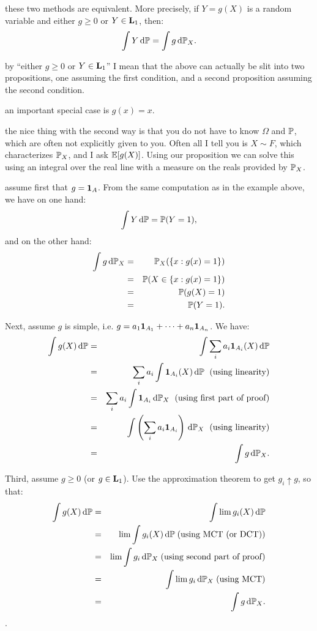 \documentclass{article}
\begin{document}
 these two methods are equivalent. More precisely, if $Y = g(X)$ is a random variable and either $g \ge 0$ or $Y \in \L_1$, then:
\[ \int Y \ud \P = \int g \ud \P_X. \]

 by ``either $g \ge 0$ or $Y \in \L_1$'' I mean that the above can actually be slit into two propositions, one assuming the first condition, and a second proposition assuming the second condition.

 an important special case is $g(x) = x$.

 the nice thing with the second way is that you do not have to know $\Omega$ and $\P$, which are often not explicitly given to you. Often all I tell you is $X \sim F$, which characterizes $\P_X$, and I ask $\E[g(X)]$. Using our proposition we can solve this using an integral over the real line with a measure on the reals provided by $\P_X$.

 assume first that $g = \1_A$. From the same computation as in the example above, we have on one hand:
\[ \int Y \ud \P = \P(Y = 1), \]
and on the other hand:
\begin{eqnarray*} 
\int g \ud \P_X &=&  \P_X(\{x : g(x) = 1\}) \\
&=& \P(X \in \{x : g(x) = 1\}) \\
&=& \P(g(X) = 1) \\
&=& \P(Y = 1).
\end{eqnarray*}

\noindent Next, assume $g$ is simple, i.e. $g = a_1 \1_{A_1} + \dots + a_n \1_{A_n}$. We have:
\begin{eqnarray*}
\int g(X) \ud \P &=& \int \sum_i a_i \1_{A_i}(X) \ud \P \\
&=& \sum_i a_i \int \1_{A_i}(X) \ud \P \;\text{ (using linearity)} \\
&=& \sum_i a_i \int \1_{A_i} \ud \P_X \;\text{ (using first part of proof)}\\
&=& \int \left(\sum_i a_i \1_{A_i}\right) \ud \P_X\;\text{ (using linearity)} \\
&=& \int g \ud \P_X.
\end{eqnarray*}

\noindent Third, assume $g \ge 0$ (or $g\in \L_1$). Use the approximation theorem to get $g_i \uparrow g$, so that:
\begin{eqnarray*}
\int g(X) \ud \P &=& \int \lim g_i(X) \ud \P \\
&=& \lim \int g_i(X) \ud \P \;\text{(using MCT (or DCT))} \\
&=& \lim \int g_i \ud \P_X \;\text{(using second part of proof)} \\
&=& \int \lim g_i \ud \P_X \;\text{(using MCT)} \\
&=& \int g \ud \P_X.
\end{eqnarray*}.
\end{document}
